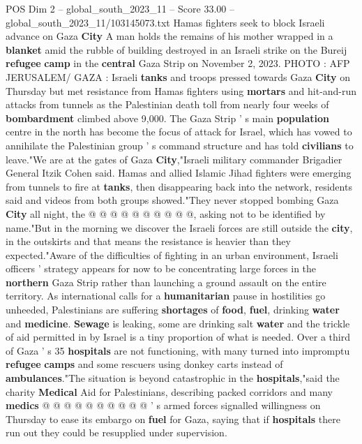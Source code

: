 \begin{textsample}{POS Dim 2 – global\_south\_2023\_11 – Score 33.00 – global\_south\_2023\_11/103145073.txt}  \label{ex:f2_pos_091}
Hamas fighters seek to block Israeli advance on Gaza \textbf{City} A man holds the remains of his mother wrapped in a \textbf{blanket} amid the rubble of building destroyed in an Israeli strike on the Bureij \textbf{refugee} \textbf{camp} in the \textbf{central} Gaza Strip on November 2, 2023.
PHOTO : AFP JERUSALEM/ GAZA : Israeli \textbf{tanks} and troops pressed towards Gaza \textbf{City} on Thursday but met resistance from Hamas fighters using \textbf{mortars} and hit-and-run attacks from tunnels as the Palestinian death toll from nearly four weeks of \textbf{bombardment} climbed above 9,000.
The Gaza Strip ' s main \textbf{population} centre in the north has become the focus of attack for Israel, which has vowed to annihilate the Palestinian group ' s command structure and has told \textbf{civilians} to leave."We are at the gates of Gaza \textbf{City},"Israeli military commander Brigadier General Itzik Cohen said.
Hamas and allied Islamic Jihad fighters were emerging from tunnels to fire at \textbf{tanks}, then disappearing back into the network, residents said and videos from both groups showed."They never stopped bombing Gaza \textbf{City} all night, the @ @ @ @ @ @ @ @ @ @, asking not to be identified by name."But in the morning we discover the Israeli forces are still outside the \textbf{city}, in the outskirts and that means the resistance is heavier than they expected."Aware of the difficulties of fighting in an urban environment, Israeli officers ' strategy appears for now to be concentrating large forces in the \textbf{northern} Gaza Strip rather than launching a ground assault on the entire territory.
As international calls for a \textbf{humanitarian} pause in hostilities go unheeded, Palestinians are suffering \textbf{shortages} of \textbf{food}, \textbf{fuel}, drinking \textbf{water} and \textbf{medicine}. \textbf{Sewage} is leaking, some are drinking salt \textbf{water} and the trickle of aid permitted in by Israel is a tiny proportion of what is needed.
Over a third of Gaza ' s 35 \textbf{hospitals} are not functioning, with many turned into impromptu \textbf{refugee} \textbf{camps} and some rescuers using donkey carts instead of \textbf{ambulances}."The situation is beyond catastrophic in the \textbf{hospitals},"said the charity \textbf{Medical} Aid for Palestinians, describing packed corridors and many \textbf{medics} @ @ @ @ @ @ @ @ @ @ ' s armed forces signalled willingness on Thursday to ease its embargo on \textbf{fuel} for Gaza, saying that if \textbf{hospitals} there run out they could be resupplied under supervision.

\end{textsample}
